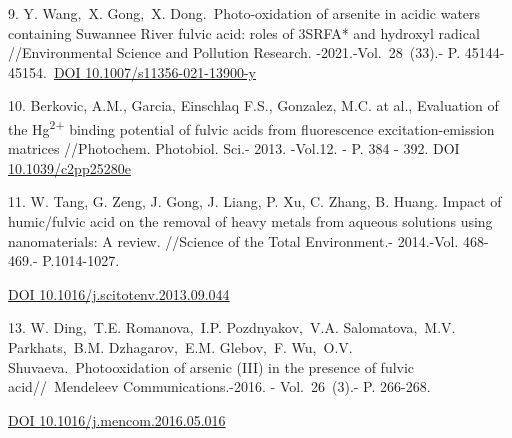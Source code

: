 \begin{references}
9. Y. Wang,~X. Gong,~X. Dong.~Photo-oxidation of arsenite in acidic
waters containing Suwannee River fulvic acid: roles of 3SRFA* and
hydroxyl radical //Environmental Science and Pollution Research.
-2021.-Vol.~28~(33).- P.
45144-45154.~\href{https://doi.org/10.1007/s11356-021-13900-y}{DOI
10.1007/s11356-021-13900-y}

10. Berkovic, A.M., Garcia, Einschlaq F.S., Gonzalez, M.C. at al.,
Evaluation of the Hg\textsuperscript{2+} binding potential of fulvic
acids from fluorescence excitation-emission matrices //Photochem.
Photobiol. Sci.- 2013. -Vol.12. - P. 384 - 392. DOI
\href{https://doi.org/10.1039/c2pp25280e}{10.1039/c2pp25280e}

11. W. Tang, G. Zeng, J. Gong, J. Liang, P. Xu, C. Zhang, B. Huang.
Impact of humic/fulvic acid on the removal of heavy metals from aqueous
solutions using nanomaterials: A review. //Science of the Total
Environment.- 2014.-Vol. 468-469.- P.1014-1027.

\href{https://doi.org/10.1016/j.scitotenv.2013.09.044}{DOI
10.1016/j.scitotenv.2013.09.044}

13. W. Ding,~T.E. Romanova,~I.P. Pozdnyakov,~V.A. Salomatova,~M.V.
Parkhats,~B.M. Dzhagarov,~E.M. Glebov,~F. Wu,~O.V.
Shuvaeva.~Photooxidation of arsenic (III) in the presence of fulvic
acid//~Mendeleev Communications.-2016. - Vol.~26~(3).- P. 266-268.~

\href{https://doi.org/10.1016/j.mencom.2016.05.016}{DOI
10.1016/j.mencom.2016.05.016}
\end{references}

